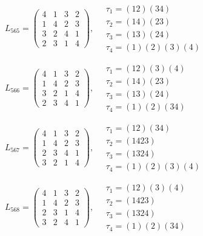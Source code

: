 $L_{565} = \begin{pmatrix} 4 & 1 & 3 & 2 \\ 1 & 4 & 2 & 3 \\ 3 & 2 & 4 & 1 \\ 2 & 3 & 1 & 4 \end{pmatrix}, \quad \begin{matrix} \tau_{1} = (1 2)(3 4) \\ \tau_{2} = (1 4)(2 3) \\ \tau_{3} = (1 3)(2 4) \\ \tau_{4} = (1)(2)(3)(4) \end{matrix}$

$L_{566} = \begin{pmatrix} 4 & 1 & 3 & 2 \\ 1 & 4 & 2 & 3 \\ 3 & 2 & 1 & 4 \\ 2 & 3 & 4 & 1 \end{pmatrix}, \quad \begin{matrix} \tau_{1} = (1 2)(3)(4) \\ \tau_{2} = (1 4)(2 3) \\ \tau_{3} = (1 3)(2 4) \\ \tau_{4} = (1)(2)(3 4) \end{matrix}$

$L_{567} = \begin{pmatrix} 4 & 1 & 3 & 2 \\ 1 & 4 & 2 & 3 \\ 2 & 3 & 4 & 1 \\ 3 & 2 & 1 & 4 \end{pmatrix}, \quad \begin{matrix} \tau_{1} = (1 2)(3 4) \\ \tau_{2} = (1 4 2 3) \\ \tau_{3} = (1 3 2 4) \\ \tau_{4} = (1)(2)(3)(4) \end{matrix}$

$L_{568} = \begin{pmatrix} 4 & 1 & 3 & 2 \\ 1 & 4 & 2 & 3 \\ 2 & 3 & 1 & 4 \\ 3 & 2 & 4 & 1 \end{pmatrix}, \quad \begin{matrix} \tau_{1} = (1 2)(3)(4) \\ \tau_{2} = (1 4 2 3) \\ \tau_{3} = (1 3 2 4) \\ \tau_{4} = (1)(2)(3 4) \end{matrix}$

